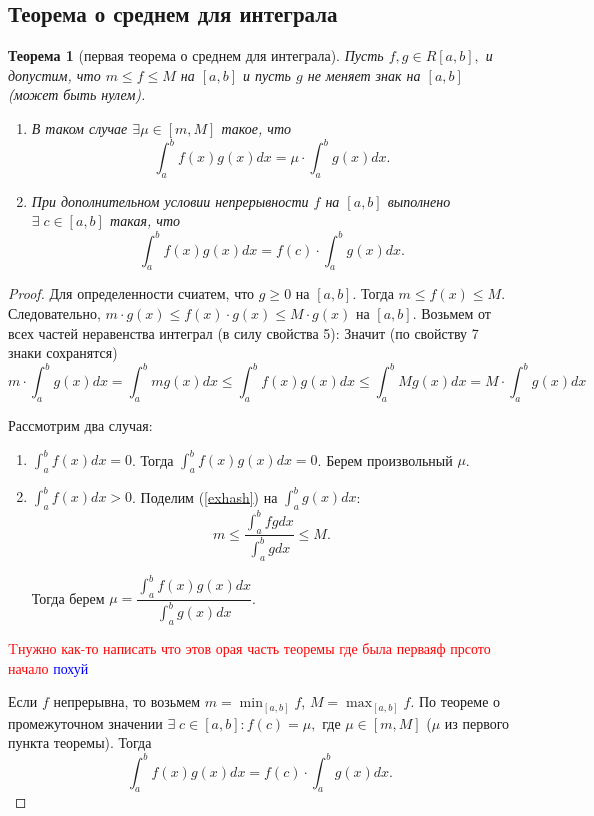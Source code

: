 \documentclass{article}
\theoremstyle{plain}
\newtheorem{theorem}{Теорема}
\theoremstyle{definition}
\theoremstyle{remark}
\begin{document}
\subsection{Теорема о среднем для интеграла}
\begin{theorem}[первая теорема о среднем для интеграла]\label{th:intavg1}
Пусть $f, g \in R[a, b],$ и допустим, что $m \leq f \leq M $ на $[a, b]$ и пусть $g$ не меняет знак на $[a, b]$ (может быть нулем). 

\begin{enumerate}
    \item В таком случае $\exists \mu \in [m ,M]$ такое, что
    $$\int_a^b f(x)g(x)dx = \mu \cdot \int_a^b g(x)dx.$$

    \item При дополнительном условии непрерывности $f$ на $[a, b]$ выполнено $\exists\; c \in [a ,b]$ такая, что$$ \int_a^b f(x)g(x)dx = f(c)\cdot \int_a^b g(x)dx.$$
\end{enumerate}
\end{theorem}
\begin{proof}
Для определенности счиатем, что $g\geq 0$ на $[a, b]$. Тогда $m \leq f(x) \leq M $. Следовательно, $m\cdot g(x) \leq f(x)\cdot g(x) \leq M\cdot g(x) $ на $[a, b].$ Возьмем от всех частей неравенства интеграл (в силу свойства 5):
Значит (по свойству 7 знаки сохранятся)
\begin{equation}\label{exhash}
 m \cdot \int_a^b g(x)dx= \int_a^b mg(x)dx \leq \int_a^b f(x)g(x)dx \leq \int_a^b Mg(x)dx = M \cdot \int_a^b g(x)dx   
\end{equation}


Рассмотрим два случая:
\begin{enumerate}
    \item $\int_a^b f(x)dx =0$. Тогда $\int_a^b f(x)g(x)dx =0$. Берем произвольный $\mu$.
    \item $\int_a^b f(x)dx > 0$. Поделим (\ref{exhash}) на $\int_a^b g(x)dx$: 
    \[
    m \leq \frac{\int_a^b fgdx }{\int_a^b g dx} \leq M.
    \] 

    
Тогда берем $\mu = \dfrac{\int_a^b f(x)g(x)dx }{\int_a^b g(x)dx} $.
\end{enumerate}

\textcolor{red}{Tнужно как-то написать что этов орая часть теоремы
где была перваяф прсото
начало}
\textcolor{blue}{похуй}

Если $f$ непрерывна, то возьмем $m = \min_{[a,b]} f$, $M = \max_{[a,b]} f$. По теореме о промежуточном значении $\exists \;c \in [a, b]: f(c) = \mu,$ где $\mu \in [m, M]$ ($\mu$ из первого пункта теоремы). Тогда $$ \int_a^b f(x)g(x)dx = f(c)\cdot \int_a^b g(x)dx.$$
\end{proof}
\end{document}
